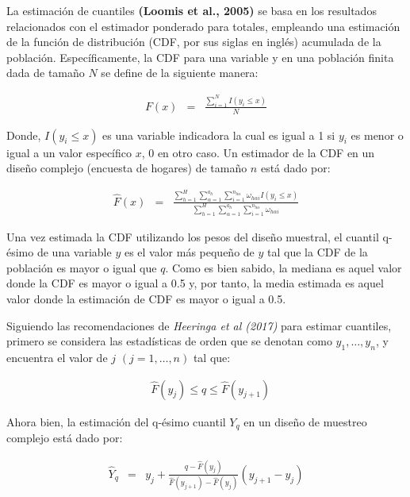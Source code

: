 \documentclass[
  12pt,
]{book}
\begin{document}
La estimación de cuantiles \textbf{(Loomis et al., 2005)} se basa en los resultados relacionados con el estimador ponderado para totales, empleando una estimación de la función de distribución (CDF, por sus siglas en inglés) acumulada de la población. Específicamente, la CDF para una variable y en una población finita dada de tamaño \(N\) se define de la siguiente manera:

\begin{eqnarray*}
F\left(x\right) & = & \frac{{\displaystyle \sum_{i=1}^{N}}I\left(y_{i}\leq x\right)}{N}
\end{eqnarray*}

Donde, \(I\left(y_{i}\leq x\right)\) es una variable indicadora la
cual es igual a 1 si \(y_{i}\) es menor o igual a un valor específico
\(x\), 0 en otro caso. Un estimador de la CDF en un diseño complejo
(encuesta de hogares) de tamaño \(n\) está dado por:

\begin{eqnarray*}
\hat{F}\left(x\right) & = & \frac{\sum_{h=1}^{H}\sum_{\alpha=1}^{a_{h}}\sum_{i=1}^{n_{h\alpha}}\omega_{h\alpha i}I\left(y_{i}\leq x\right)}{\sum_{h=1}^{H}\sum_{\alpha=1}^{a_{h}}\sum_{i=1}^{n_{h\alpha}}\omega_{h\alpha i}}
\end{eqnarray*}

Una vez estimada la CDF utilizando los pesos del diseño muestral, el cuantil q-ésimo de una variable \(y\) es el valor más pequeño de \(y\) tal que la CDF de la población es mayor o igual que \(q\). Como es bien sabido, la mediana es aquel valor donde la CDF es mayor o igual a 0.5 y, por tanto, la media estimada es aquel valor donde la estimación de CDF es mayor o igual a 0.5.

Siguiendo las recomendaciones de \emph{Heeringa et al (2017)} para estimar cuantiles, primero se considera las estadísticas de orden que se denotan como \(y_{1},\ldots,y_{n}\), y encuentra el valor de \(j\) \((j=1,\ldots,n)\) tal que:

\begin{eqnarray*}
 & \hat{F}\left(y_{j}\right)\leq q\leq\hat{F}\left(y_{j+1}\right)
\end{eqnarray*}

Ahora bien, la estimación del q-ésimo cuantil \(Y_{q}\) en un diseño de muestreo complejo está dado por:

\begin{eqnarray*}
\hat{Y}_{q} & = & y_{j}+\frac{q-\hat{F}\left(y_{j}\right)}{\hat{F}\left(y_{j+1}\right)-\hat{F}\left(y_{j}\right)}\left(y_{j+1}-y_{j}\right)
\end{eqnarray*}
\end{document}
